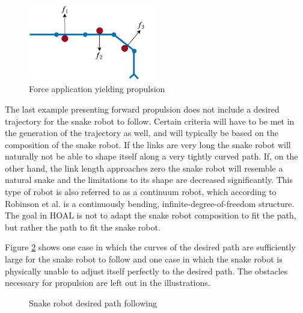 \begin{figure}
    \centering
    \includegraphics[width=0.5\textwidth]{figures/theory/obst-push-prop.pdf}
    \caption{Force application yielding propulsion}
    \label{fig:force-prop}
\end{figure}


The last example presenting forward propulsion does not include a desired trajectory for the snake robot to follow. Certain criteria will have to be met in the generation of the trajectory as well, and will typically be based on the composition of the snake robot. If the links are very long the snake robot will naturally not be able to shape itself along a very tightly curved path. If, on the other hand, the link length approaches zero the snake robot will resemble a natural snake and the limitations to its shape are decreased significantly. This type of robot is also referred to as a continuum robot, which according to Robinson et al. \cite{robinson1999continuum} is a continuously bending, infinite-degree-of-freedom structure. The goal in HOAL is not to adapt the snake robot composition to fit the path, but rather the path to fit the snake robot.

Figure \ref{fig:path-following} shows one case in which the curves of the desired path are sufficiently large for the snake robot to follow and one case in which the snake robot is physically unable to adjust itself perfectly to the desired path. The obstacles necessary for propulsion are left out in the illustrations.

\begin{figure}[H]
    \centering

    \hfil

    \caption{Snake robot desired path following}
    \label{fig:path-following}
\end{figure}

